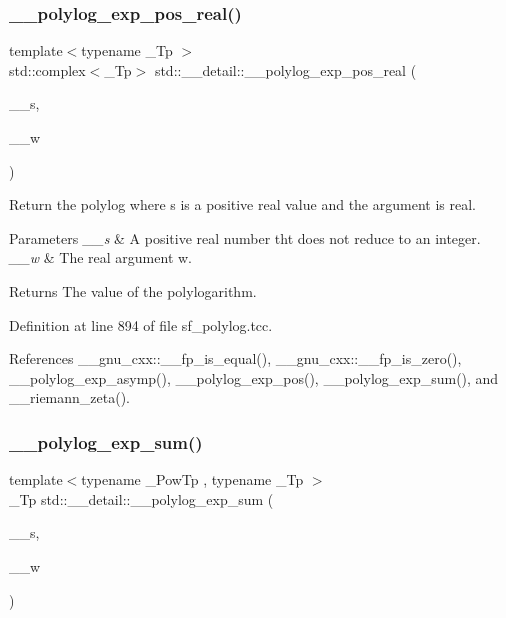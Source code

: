 \subsubsection{\texorpdfstring{\+\_\+\+\_\+polylog\+\_\+exp\+\_\+pos\+\_\+real()}{\_\_polylog\_exp\_pos\_real()}\hspace{0.1cm}{\footnotesize\ttfamily [2/2]}}
{\footnotesize\ttfamily template$<$typename \+\_\+\+Tp $>$ \\
std\+::complex$<$\+\_\+\+Tp$>$ std\+::\+\_\+\+\_\+detail\+::\+\_\+\+\_\+polylog\+\_\+exp\+\_\+pos\+\_\+real (\begin{DoxyParamCaption}\item[{\+\_\+\+Tp}]{\+\_\+\+\_\+s,  }\item[{\+\_\+\+Tp}]{\+\_\+\+\_\+w }\end{DoxyParamCaption})}

Return the polylog where s is a positive real value and the argument is real.


\begin{DoxyParams}{Parameters}
{\em \+\_\+\+\_\+s} & A positive real number tht does not reduce to an integer. \\
\hline
{\em \+\_\+\+\_\+w} & The real argument w. \\
\hline
\end{DoxyParams}
\begin{DoxyReturn}{Returns}
The value of the polylogarithm. 
\end{DoxyReturn}


Definition at line 894 of file sf\+\_\+polylog.\+tcc.



References \+\_\+\+\_\+gnu\+\_\+cxx\+::\+\_\+\+\_\+fp\+\_\+is\+\_\+equal(), \+\_\+\+\_\+gnu\+\_\+cxx\+::\+\_\+\+\_\+fp\+\_\+is\+\_\+zero(), \+\_\+\+\_\+polylog\+\_\+exp\+\_\+asymp(), \+\_\+\+\_\+polylog\+\_\+exp\+\_\+pos(), \+\_\+\+\_\+polylog\+\_\+exp\+\_\+sum(), and \+\_\+\+\_\+riemann\+\_\+zeta().

\mbox{\label{namespacestd_1_1____detail_acbdb1ad0debb8c919b4dcb1589af734c}} 
\subsubsection{\texorpdfstring{\+\_\+\+\_\+polylog\+\_\+exp\+\_\+sum()}{\_\_polylog\_exp\_sum()}}
{\footnotesize\ttfamily template$<$typename \+\_\+\+Pow\+Tp , typename \+\_\+\+Tp $>$ \\
\+\_\+\+Tp std\+::\+\_\+\+\_\+detail\+::\+\_\+\+\_\+polylog\+\_\+exp\+\_\+sum (\begin{DoxyParamCaption}\item[{\+\_\+\+Pow\+Tp}]{\+\_\+\+\_\+s,  }\item[{\+\_\+\+Tp}]{\+\_\+\+\_\+w }\end{DoxyParamCaption})}

